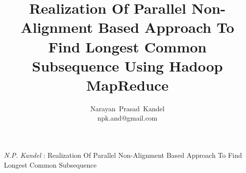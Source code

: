 \documentclass[journal,twoside]{IEEEtran}
\begin{document}
\setcounter{page}{37}
%
\title{Realization Of Parallel Non-Alignment Based Approach To Find Longest Common Subsequence Using Hadoop MapReduce}
%
%
%

\author{Narayan~Prasad~Kandel \\ npk.and@gmail.com}
% 
%


%
{\textit{ N.P. Kandel }: Realization Of Parallel Non-Alignment Based Approach To Find Longest Common Subsequence}
% 




\end{document}
